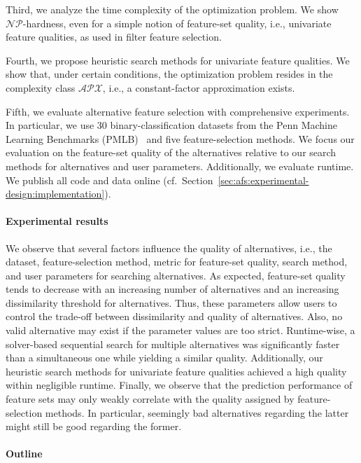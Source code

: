 \documentclass{article}
\theoremstyle{definition}
\begin{document}
Third, we analyze the time complexity of the optimization problem.
We show $\mathcal{NP}$-hardness, even for a simple notion of feature-set quality, i.e., univariate feature qualities, as used in filter feature selection.

Fourth, we propose heuristic search methods for univariate feature qualities.
We show that, under certain conditions, the optimization problem resides in the complexity class $\mathcal{APX}$, i.e., a constant-factor approximation exists.

Fifth, we evaluate alternative feature selection with comprehensive experiments.
In particular, we use 30 binary-classification datasets from the Penn Machine Learning Benchmarks (PMLB)~\cite{olson2017pmlb, romano2021pmlb} and five feature-selection methods.
We focus our evaluation on the feature-set quality of the alternatives relative to our search methods for alternatives and user parameters.
Additionally, we evaluate runtime.
We publish all code and data online (cf.~Section~\ref{sec:afs:experimental-design:implementation}).

\paragraph{Experimental results}

We observe that several factors influence the quality of alternatives, i.e., the dataset, feature-selection method, metric for feature-set quality, search method, and user parameters for searching alternatives.
As expected, feature-set quality tends to decrease with an increasing number of alternatives and an increasing dissimilarity threshold for alternatives.
Thus, these parameters allow users to control the trade-off between dissimilarity and quality of alternatives.
Also, no valid alternative may exist if the parameter values are too strict.
Runtime-wise, a solver-based sequential search for multiple alternatives was significantly faster than a simultaneous one while yielding a similar quality.
Additionally, our heuristic search methods for univariate feature qualities achieved a high quality within negligible runtime.
Finally, we observe that the prediction performance of feature sets may only weakly correlate with the quality assigned by feature-selection methods.
In particular, seemingly bad alternatives regarding the latter might still be good regarding the former.

\paragraph{Outline}
\end{document}
